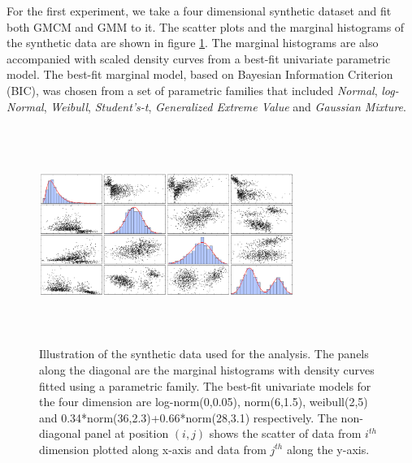 \documentclass[]{article}
\begin{document}
For the first experiment, we take a four dimensional synthetic dataset and fit both GMCM and GMM to it. The scatter plots and the marginal histograms of the synthetic data are shown in figure \ref{fig:synthetic_data}. The marginal histograms are also accompanied with scaled density curves from a best-fit univariate parametric model. The best-fit marginal model, based on Bayesian Information Criterion (BIC), was chosen from a set of parametric families that included \emph{Normal}, \emph{log-Normal}, \emph{Weibull}, \emph{Student's-t}, \emph{Generalized Extreme Value} and \emph{Gaussian Mixture}. 
\begin{figure}[h]
\includegraphics[width= 235pt,height=200pt]{synthetic_data_illustration_new}
\caption{Illustration of the synthetic data used for the analysis. The panels along the diagonal are the marginal histograms with density curves fitted using a parametric family. The best-fit univariate models for the four dimension are log-norm(0,0.05), norm(6,1.5), weibull(2,5) and 0.34*norm(36,2.3)+0.66*norm(28,3.1) respectively. The non-diagonal panel at position $(i,j)$ shows the scatter of data from $i^{th}$ dimension plotted along x-axis and data from $j^{th}$ along the y-axis.}
\label{fig:synthetic_data}
\end{figure}
\end{document}
